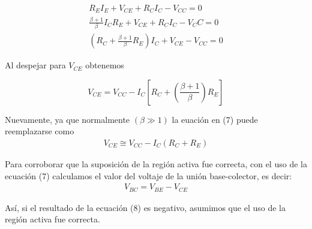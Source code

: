 \documentclass{article}
\begin{document}
\begin{align}
	R_E I_E + V_{CE} + R_C I_C - V_{CC} = 0\nonumber\\
	\frac{\beta + 1}{\beta}I_C R_E + V_{CE} + R_CI_C - V_CC = 0\nonumber\\
	\left( R_C + \frac{\beta + 1}{\beta} R_E \right)I_C + V_{CE} - V_{CC} = 0\nonumber
\end{align}

\noindent Al despejar para $V_{CE}$ obtenemos
\begin{tcolorbox}[colback=red!5!white,colframe=red!75!black,arc=0mm,boxrule=0mm,width=(\linewidth+0.5cm),extrude right by=-1.5cm]
	\begin{equation}
		V_{CE} = V_{CC} - I_C\left[ R_C + \left( \frac{\beta + 1}{\beta} \right)R_E \right]
	\end{equation}
\end{tcolorbox}

\noindent Nuevamente, ya que normalmente $(\beta \gg 1)$ la euación en (7) puede reemplazarse como 
\begin{align}
	V_{CE} \cong V_{CC} - I_C(R_C + R_E)
\end{align}

\noindent Para corroborar que la suposición de la región activa fue correcta, con el uso de la ecuación (7) calculamos el valor del voltaje de la unión base-colector, es decir:
\begin{align}
	V_{BC} = V_{BE} - V_{CE}
\end{align}

\noindent Así, si el resultado de la ecuación (8) es negativo, asumimos que el uso de la región activa fue correcta.
\end{document}
